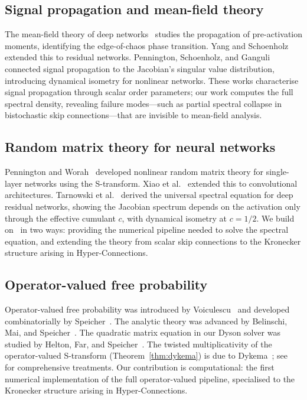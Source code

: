 \subsection{Signal propagation and mean-field theory}

The mean-field theory of deep networks~\cite{schoenholz2017deep} studies the propagation of pre-activation moments, identifying the edge-of-chaos phase transition. Yang and Schoenholz~\cite{yang2017mean} extended this to residual networks. Pennington, Schoenholz, and Ganguli~\cite{pennington2017resurrecting} connected signal propagation to the Jacobian's singular value distribution, introducing dynamical isometry for nonlinear networks. These works characterise signal propagation through scalar order parameters; our work computes the full spectral density, revealing failure modes---such as partial spectral collapse in bistochastic skip connections---that are invisible to mean-field analysis.

\subsection{Random matrix theory for neural networks}

Pennington and Worah~\cite{pennington2017nonlinear} developed nonlinear random matrix theory for single-layer networks using the S-transform. Xiao et al.~\cite{xiao2018dynamical} extended this to convolutional architectures. Tarnowski et al.~\cite{tarnowski2019dynamical} derived the universal spectral equation for deep residual networks, showing the Jacobian spectrum depends on the activation only through the effective cumulant $c$, with dynamical isometry at $c = 1/2$. We build on~\cite{tarnowski2019dynamical} in two ways: providing the numerical pipeline needed to solve the spectral equation, and extending the theory from scalar skip connections to the Kronecker structure arising in Hyper-Connections.

\subsection{Operator-valued free probability}

Operator-valued free probability was introduced by Voiculescu~\cite{voiculescu1995operations} and developed combinatorially by Speicher~\cite{speicher1998combinatorial}. The analytic theory was advanced by Belinschi, Mai, and Speicher~\cite{belinschi2017analytic}. The quadratic matrix equation in our Dyson solver was studied by Helton, Far, and Speicher~\cite{helton2007operator}. The twisted multiplicativity of the operator-valued S-transform (Theorem~\ref{thm:dykema}) is due to Dykema~\cite{dykema2006multilinear}; see~\cite{nica2006lectures,mingo2017free} for comprehensive treatments. Our contribution is computational: the first numerical implementation of the full operator-valued pipeline, specialised to the Kronecker structure arising in Hyper-Connections.
